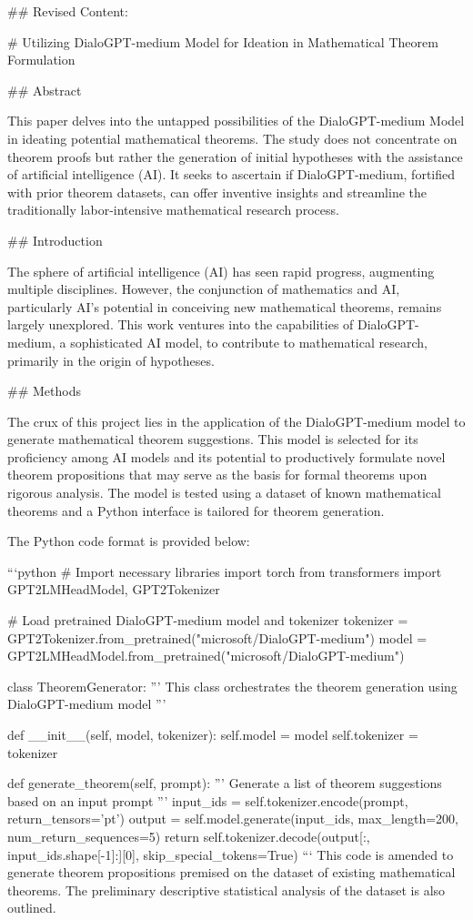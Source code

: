 ## Revised Content:

# Utilizing DialoGPT-medium Model for Ideation in Mathematical Theorem Formulation

## Abstract

This paper delves into the untapped possibilities of the DialoGPT-medium Model in ideating potential mathematical theorems. The study does not concentrate on theorem proofs but rather the generation of initial hypotheses with the assistance of artificial intelligence (AI). It seeks to ascertain if DialoGPT-medium, fortified with prior theorem datasets, can offer inventive insights and streamline the traditionally labor-intensive mathematical research process.

## Introduction

The sphere of artificial intelligence (AI) has seen rapid progress, augmenting multiple disciplines. However, the conjunction of mathematics and AI, particularly AI’s potential in conceiving new mathematical theorems, remains largely unexplored. This work ventures into the capabilities of DialoGPT-medium, a sophisticated AI model, to contribute to mathematical research, primarily in the origin of hypotheses.

## Methods

The crux of this project lies in the application of the DialoGPT-medium model to generate mathematical theorem suggestions. This model is selected for its proficiency among AI models and its potential to productively formulate novel theorem propositions that may serve as the basis for formal theorems upon rigorous analysis. The model is tested using a dataset of known mathematical theorems and a Python interface is tailored for theorem generation.

The Python code format is provided below:

```python
# Import necessary libraries
import torch
from transformers import GPT2LMHeadModel, GPT2Tokenizer

# Load pretrained DialoGPT-medium model and tokenizer
tokenizer = GPT2Tokenizer.from_pretrained("microsoft/DialoGPT-medium")
model = GPT2LMHeadModel.from_pretrained("microsoft/DialoGPT-medium")

class TheoremGenerator:
    '''
    This class orchestrates the theorem generation using DialoGPT-medium model
    '''

    def __init__(self, model, tokenizer):
        self.model = model
        self.tokenizer = tokenizer

    def generate_theorem(self, prompt):
        '''
        Generate a list of theorem suggestions based on an input prompt
        '''
        input_ids = self.tokenizer.encode(prompt, return_tensors='pt')
        output = self.model.generate(input_ids, max_length=200, num_return_sequences=5)
        return self.tokenizer.decode(output[:, input_ids.shape[-1]:][0], skip_special_tokens=True)
```
This code is amended to generate theorem propositions premised on the dataset of existing mathematical theorems. The preliminary descriptive statistical analysis of the dataset is also outlined.

